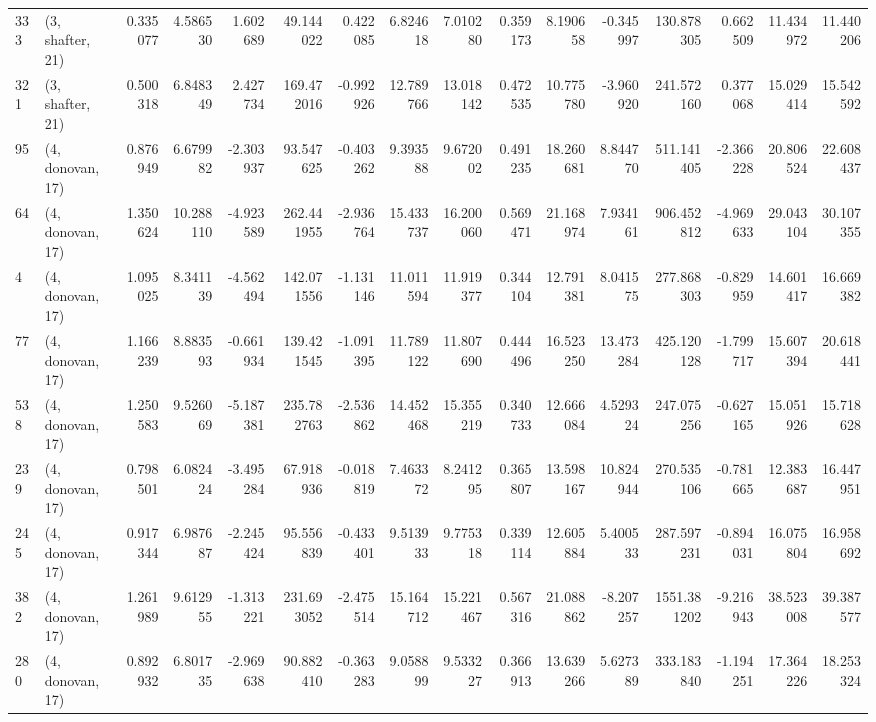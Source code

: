 \begin{tabular}{llrrrrrrrrrrrrrr}
333 &  (3, shafter, 21) &   0.335077 &   4.586530 &   1.602689 &    49.144022 &   0.422085 &   6.824618 &   7.010280 &  0.359173 &   8.190658 &  -0.345997 &    130.878305 &   0.662509 &   11.434972 &   11.440206 \\
321 &  (3, shafter, 21) &   0.500318 &   6.848349 &   2.427734 &   169.472016 &  -0.992926 &  12.789766 &  13.018142 &  0.472535 &  10.775780 &  -3.960920 &    241.572160 &   0.377068 &   15.029414 &   15.542592 \\
95  &  (4, donovan, 17) &   0.876949 &   6.679982 &  -2.303937 &    93.547625 &  -0.403262 &   9.393588 &   9.672002 &  0.491235 &  18.260681 &   8.844770 &    511.141405 &  -2.366228 &   20.806524 &   22.608437 \\
64  &  (4, donovan, 17) &   1.350624 &  10.288110 &  -4.923589 &   262.441955 &  -2.936764 &  15.433737 &  16.200060 &  0.569471 &  21.168974 &   7.934161 &    906.452812 &  -4.969633 &   29.043104 &   30.107355 \\
4   &  (4, donovan, 17) &   1.095025 &   8.341139 &  -4.562494 &   142.071556 &  -1.131146 &  11.011594 &  11.919377 &  0.344104 &  12.791381 &   8.041575 &    277.868303 &  -0.829959 &   14.601417 &   16.669382 \\
77  &  (4, donovan, 17) &   1.166239 &   8.883593 &  -0.661934 &   139.421545 &  -1.091395 &  11.789122 &  11.807690 &  0.444496 &  16.523250 &  13.473284 &    425.120128 &  -1.799717 &   15.607394 &   20.618441 \\
538 &  (4, donovan, 17) &   1.250583 &   9.526069 &  -5.187381 &   235.782763 &  -2.536862 &  14.452468 &  15.355219 &  0.340733 &  12.666084 &   4.529324 &    247.075256 &  -0.627165 &   15.051926 &   15.718628 \\
239 &  (4, donovan, 17) &   0.798501 &   6.082424 &  -3.495284 &    67.918936 &  -0.018819 &   7.463372 &   8.241295 &  0.365807 &  13.598167 &  10.824944 &    270.535106 &  -0.781665 &   12.383687 &   16.447951 \\
245 &  (4, donovan, 17) &   0.917344 &   6.987687 &  -2.245424 &    95.556839 &  -0.433401 &   9.513933 &   9.775318 &  0.339114 &  12.605884 &   5.400533 &    287.597231 &  -0.894031 &   16.075804 &   16.958692 \\
382 &  (4, donovan, 17) &   1.261989 &   9.612955 &  -1.313221 &   231.693052 &  -2.475514 &  15.164712 &  15.221467 &  0.567316 &  21.088862 &  -8.207257 &   1551.381202 &  -9.216943 &   38.523008 &   39.387577 \\
280 &  (4, donovan, 17) &   0.892932 &   6.801735 &  -2.969638 &    90.882410 &  -0.363283 &   9.058899 &   9.533227 &  0.366913 &  13.639266 &   5.627389 &    333.183840 &  -1.194251 &   17.364226 &   18.253324 \\

\end{tabular}
